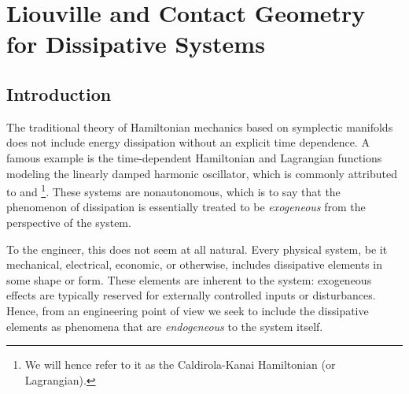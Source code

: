 \chapter{Liouville and Contact Geometry for Dissipative Systems}
\label{chap:contact_mechanics} 
\section{Introduction}
\label{sec:contact_intro}
The traditional theory of Hamiltonian mechanics based on symplectic manifolds does not include energy dissipation without an explicit time dependence. A famous example is the time-dependent Hamiltonian and Lagrangian functions modeling the linearly damped harmonic oscillator, which is commonly attributed to \citet{Caldirola1941} and \citet{Kanai1948}\footnote{We will hence refer to it as the Caldirola-Kanai Hamiltonian (or Lagrangian).}. 
These systems are nonautonomous, which is to say that the phenomenon of dissipation is essentially treated to be \emph{exogeneous} from the perspective of the system.  

To the engineer, this does not seem at all natural. Every physical system, be it mechanical, electrical, economic, or otherwise, includes dissipative elements in some shape or form. These elements are inherent to the system: exogeneous effects are typically reserved for externally controlled inputs or disturbances. Hence, from an engineering point of view we seek to include the dissipative elements as phenomena that are \emph{endogeneous} to the system itself.

